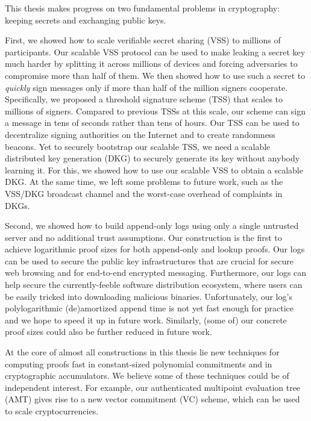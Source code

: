 This thesis makes progress on two fundamental problems in cryptography: keeping secrets and exchanging public keys.

First, we showed how to scale verifiable secret sharing (VSS) to millions of participants.
Our scalable VSS protocol can be used to make leaking a secret key much harder by splitting it across millions of devices and forcing adversaries to compromise more than half of them.
We then showed how to use such a secret to \textit{quickly} sign messages only if more than half of the million signers cooperate.
Specifically, we proposed a threshold signature scheme (TSS) that scales to millions of signers.
Compared to previous TSSs at this scale, our scheme can sign a message in tens of seconds rather than tens of hours.
Our TSS can be used to decentralize signing authorities on the Internet and to create randomness beacons.
Yet to securely bootstrap our scalable TSS, we need a scalable distributed key generation (DKG) to securely generate its key without anybody learning it.
For this, we showed how to use our scalable VSS to obtain a scalable DKG.
At the same time, we left some problems to future work, such as the VSS/DKG broadcast channel and the worst-case overhead of complaints in DKGs.

Second, we showed how to build append-only logs using only a single untrusted server and no additional trust assumptions.
Our construction is the first to achieve logarithmic proof sizes for both append-only and lookup proofs.
Our logs can be used to secure the public key infrastructures that are crucial for secure web browsing and for end-to-end encrypted messaging.
Furthermore, our logs can help secure the currently-feeble software distribution ecosystem, where users can be easily tricked into downloading malicious binaries.
Unfortunately, our log's polylogarithmic (de)amortized append time is not yet fast enough for practice and we hope to speed it up in future work.
Similarly, (some of) our concrete proof sizes could also be further reduced in future work.

At the core of almost all constructions in this thesis lie new techniques for computing proofs fast in constant-sized polynomial commitments and in cryptographic accumulators.
We believe some of these techniques could be of independent interest.
For example, our authenticated multipoint evaluation tree (AMT) gives rise to a new vector commitment (VC) scheme, which can be used to scale cryptocurrencies.
